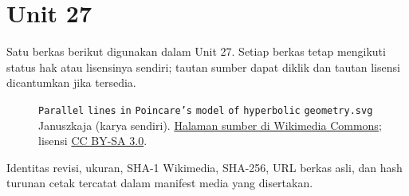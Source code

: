 \section*{Unit 27}
Satu berkas berikut digunakan dalam Unit 27. Setiap berkas tetap mengikuti status hak atau lisensinya sendiri; tautan sumber dapat diklik dan tautan lisensi dicantumkan jika tersedia.
\begin{description}
\item[]\texttt{Parallel} \texttt{lines} \texttt{in} \texttt{Poincare's} \texttt{model} \texttt{of} \texttt{hyperbolic} \texttt{geometry.svg}
Januszkaja (karya sendiri).
\href{https://commons.wikimedia.org/wiki/File:Parallel_lines_in_Poincare%27s_model_of_hyperbolic_geometry.svg}{Halaman sumber di Wikimedia Commons}; lisensi \href{https://creativecommons.org/licenses/by-sa/3.0/}{CC BY-SA 3.0}.
\end{description}
Identitas revisi, ukuran, SHA-1 Wikimedia, SHA-256, URL berkas asli, dan hash turunan cetak tercatat dalam manifest media yang disertakan.
